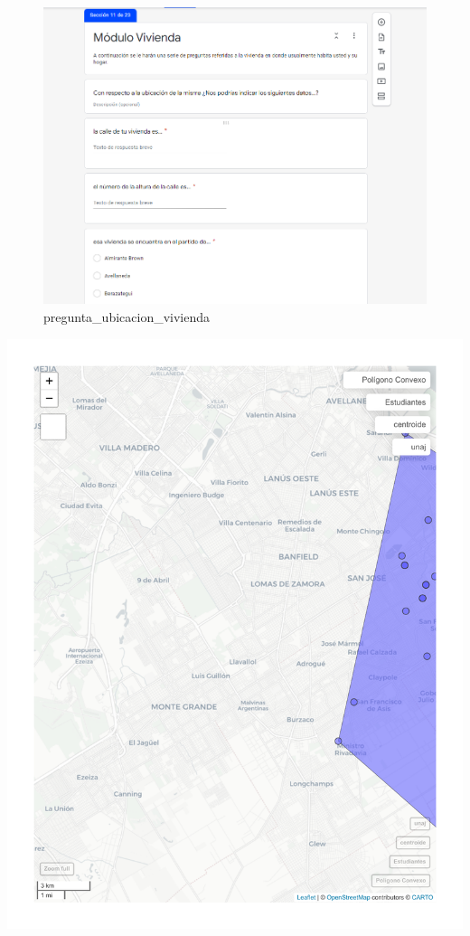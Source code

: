 \documentclass[
  letterpaper,
  DIV=11,
  numbers=noendperiod]{scrreprt}
\begin{document}
\begin{figure}

{\centering \includegraphics[width=6.25in,height=\textheight]{./Inputs/Images/pregunta_geo.png}

}

\caption{pregunta\_ubicacion\_vivienda}

\end{figure}

\includegraphics{./geo_files/figure-pdf/geo_mapa-1.pdf}
\end{document}
